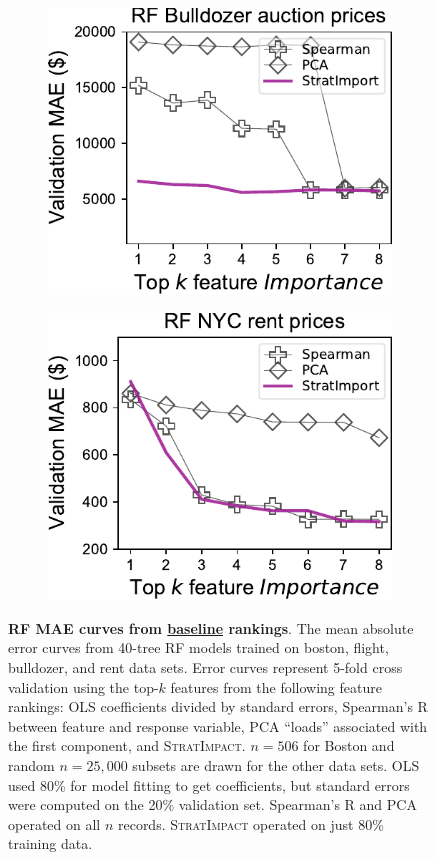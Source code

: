 \documentclass[11pt]{article}
\newcommand{\simp}{\fontfamily{cmr}\textsc{\small StratImpact}}
\begin{document}
\begin{figure}
\begin{subfigure}{.245\textwidth}
\includegraphics[scale=0.45]{images/bulldozer-topk-RF-baseline.pdf}
\subcaption{}
\end{subfigure}
\begin{subfigure}{.245\textwidth}
    \centering
\includegraphics[scale=0.45]{images/rent-topk-RF-baseline.pdf}
\subcaption{}
\end{subfigure} 
\caption{\small {\bf RF MAE curves from \underline{baseline} rankings}. The mean absolute error curves from 40-tree RF models trained on boston, flight, bulldozer, and rent data sets. Error curves represent 5-fold cross validation using the top-$k$ features from the following feature rankings: OLS coefficients divided by standard errors, Spearman's R between feature and response variable, PCA ``loads'' associated with the first component, and \simp{}. $n=506$ for Boston and random $n=25,000$ subsets are drawn for the other data sets. OLS used 80\% for model fitting to get coefficients, but standard errors were computed on the 20\% validation set.  Spearman's R and PCA operated on all $n$ records. \simp{} operated on just 80\% training data.}
\label{fig:baseline}
\end{figure}
\end{document}
